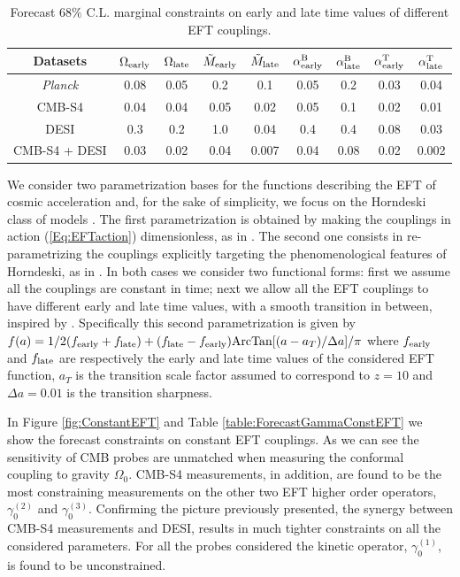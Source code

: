 \begin{table}[t!]
\begin{center}
\begin{tabular}{|c||c|c||c|c|c|c|c|c|} 
\hline
Datasets 			& $\Omega_{\rm early}$ & $\Omega_{\rm late}$ & $\tilde{M}_{\rm early}$ &  $\tilde{M}_{\rm late}$ & $\alpha^{\rm B}_{\rm early}$ & $\alpha^{\rm B}_{\rm late}$ & $\alpha^{\rm T}_{\rm early}$  & $\alpha^{\rm T}_{\rm late}$   \\
\hline
\hline
{\it Planck}  		& 0.08 & 0.05 & 0.2 &  0.1 & 0.05 & 0.2 & 0.03 & 0.04 \\
\hline
CMB-S4       &  0.04 &  0.04 & 0.05 & 0.02 & 0.05 & 0.1 & 0.02 & 0.01 \\
\hline
DESI            & 0.3 & 0.2 & 1.0 & 0.04 & 0.4 & 0.4 & 0.08 & 0.03 \\
\hline
CMB-S4 + DESI  &  0.03 &  0.02 & 0.04 & 0.007 & 0.04 & 0.08 & 0.02 & 0.002\\
\hline
\end{tabular}
\caption{Forecast $68\%$ C.L. marginal constraints on early and late time values of different EFT couplings.}
\label{table:ForecastAlphaAtan}
\end{center}
\end{table}

We consider two parametrization bases for the functions describing the EFT of cosmic acceleration and, for the sake of simplicity, we focus on the Horndeski class of models \cite{Horndeski:1974wa}.
%
The first parametrization is obtained by making the couplings in action (\ref{Eq:EFTaction}) dimensionless, as in \cite{Hu:2014oga}.
The second one consists in re-parametrizing the couplings explicitly targeting the phenomenological features of Horndeski, as in \cite{Bellini:2014fua}.
%
In both cases we consider two functional forms: first we assume all the couplings are constant in time; next we allow all the EFT couplings to have different early and late time values, with a smooth transition in between, inspired by \cite{Linder:2015rcz}. Specifically this second parametrization is given by $f(a)= 1/2 (f_{\rm early} + f_{\rm late}) + ( f_{\rm late} -f_{\rm early} ) {\rm ArcTan}[(a - a_T)/\Delta a]/\pi$ where $f_{\rm early}$ and $f_{\rm late}$ are respectively the early and late time values of the considered EFT function, $a_T$ is the transition scale factor assumed to correspond to $z=10$ and $\Delta a=0.01$ is the transition sharpness. 
%

In Figure \ref{fig:ConstantEFT} and Table \ref{table:ForecastGammaConstEFT} we show the forecast constraints on constant EFT couplings. As we can see the sensitivity of CMB probes are unmatched when measuring the conformal coupling to gravity $\Omega_0$. 
CMB-S4 measurements, in addition, are found to be the most constraining measurements on the other two EFT higher order operators, $\gamma_0^{(2)}$ and $\gamma_0^{(3)}$. Confirming the picture previously presented, the synergy between CMB-S4 measurements and DESI, results in much tighter constraints on all the considered parameters.
For all the probes considered the kinetic operator, $\gamma_0^{(1)}$, is found to be unconstrained. 

